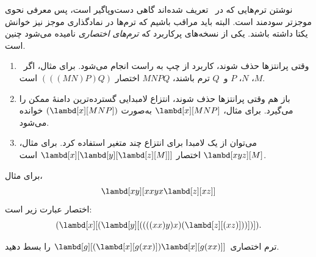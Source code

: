\documentclass[../../../include/open-logic-section]{subfiles}
\begin{document}

نوشتن ترم‌هایی که در~ تعریف شده‌اند گاهی
دست‌وپاگیر است، پس معرفی نحوی موجزتر سودمند است. البته باید مراقب باشیم
که ترم‌ها در نمادگذاری موجز نیز خوانش یکتا داشته باشند. یکی از نسخه‌های
پرکاربرد که \emph{ترم‌های اختصاری} نامیده می‌شود چنین است.

\begin{enumerate}
\item وقتی پرانتزها حذف شوند، کاربرد از چپ به راست انجام می‌شود. برای
  مثال، اگر~$M$، $N$، $P$ و~$Q$ ترم باشند، $MNPQ$ اختصار
  $(((MN)P)Q)$ است.
\item باز هم وقتی پرانتزها حذف شوند، انتزاع لامبدایی گسترده‌ترین دامنهٔ
  ممکن را می‌گیرد. برای مثال، $\lambd[x][MNP]$ به‌صورت
  $(\lambd[x][MNP])$ خوانده می‌شود.
\item می‌توان از یک لامبدا برای انتزاع چند متغیر استفاده کرد. برای مثال،
  $\lambd[xyz][M]$ اختصار
  $\lambd[x][\lambd[y][\lambd[z][M]]]$ است.
\end{enumerate}

برای مثال،
\[
\lambd[xy][xxyx \lambd[z][xz]]
\]
اختصار عبارت زیر است:
\[
(\lambd[x][(\lambd[y][((((xx)y)x)(\lambd[z][(xz)]))])]).
\]

\begin{prob}
ترم اختصاری~$\lambd[g][(\lambd[x][g (x x)])
  \lambd[x][g (x x)]]$ را بسط دهید.
\end{prob}
\end{document}
